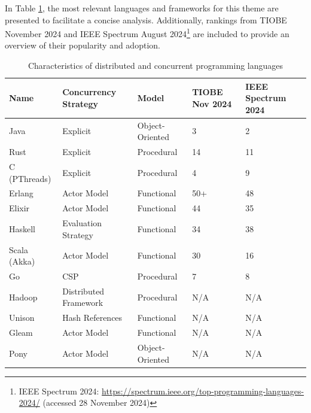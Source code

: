 In Table \ref{tab:languages_comparison}, the most relevant languages and frameworks for this theme are presented to facilitate a concise analysis. Additionally, rankings from TIOBE November 2024 and IEEE Spectrum August 2024\footnote{IEEE Spectrum 2024: \url{https://spectrum.ieee.org/top-programming-languages-2024/} (accessed 28 November 2024)} are included to provide an overview of their popularity and adoption.

\begin{table}[h!]
    \centering
    \hspace*{-0.2cm}
    \begin{tabular}{|l|p{3.1cm}|p{3.1cm}|p{2cm}|p{2cm}|}
        \hline
        \textbf{Name} & \textbf{Concurrency Strategy} & \textbf{Model}  & \textbf{TIOBE Nov 2024} & \textbf{IEEE Spectrum 2024} \\ \hline
        Java          & Explicit                      & Object-Oriented & 3                       & 2                           \\ \hline
        Rust          & Explicit                      & Procedural      & 14                      & 11                          \\ \hline
        C (PThreads)  & Explicit                      & Procedural      & 4                       & 9                           \\ \hline
        Erlang        & Actor Model                   & Functional      & 50+                     & 48                          \\ \hline
        Elixir        & Actor Model                   & Functional      & 44                      & 35                          \\ \hline
        Haskell       & Evaluation Strategy           & Functional      & 34                      & 38                          \\ \hline
        Scala (Akka)  & Actor Model                   & Functional      & 30                      & 16                          \\ \hline
        Go            & CSP                           & Procedural      & 7                       & 8                           \\ \hline
        Hadoop        & Distributed Framework         & Procedural      & N/A                     & N/A                         \\ \hline
        Unison        & Hash References               & Functional      & N/A                     & N/A                         \\ \hline
        Gleam         & Actor Model                   & Functional      & N/A                     & N/A                         \\ \hline
        Pony          & Actor Model                   & Object-Oriented & N/A                     & N/A                         \\ \hline
    \end{tabular}
    \caption{Characteristics of distributed and concurrent programming languages}
    \label{tab:languages_comparison}
\end{table}


